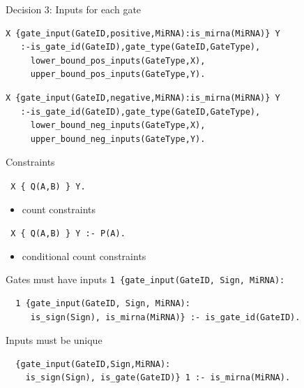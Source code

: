 \documentclass[10pt,dvipsnames]{beamer}
\begin{document}
\begin{frame}[fragile]{Decision 3: Inputs for each gate}
\small
{\color{blue}{\large positive inputs:}}
\begin{verbatim}
X {gate_input(GateID,positive,MiRNA):is_mirna(MiRNA)} Y 
   :-is_gate_id(GateID),gate_type(GateID,GateType),
     lower_bound_pos_inputs(GateType,X), 
     upper_bound_pos_inputs(GateType,Y).
\end{verbatim}

{\color{blue}{\large negative inputs:}}
\begin{verbatim}
X {gate_input(GateID,negative,MiRNA):is_mirna(MiRNA)} Y 
   :-is_gate_id(GateID),gate_type(GateID,GateType),
     lower_bound_neg_inputs(GateType,X),
     upper_bound_neg_inputs(GateType,Y).
\end{verbatim}
\end{frame}



\begin{frame}[fragile]{Constraints}
 \begin{center}
  \texttt{ X \{ Q(A,B) \} Y. }
 \end{center}
 \begin{itemize}
  \item count constraints
 \end{itemize}
 \vspace{1cm}
 \begin{center}
  \texttt{ X \{ Q(A,B) \} Y :- P(A). }
 \end{center}
 \begin{itemize}
  \item conditional count constraints
 \end{itemize}

\end{frame}


\begin{frame}[fragile]{Gates must have inputs}
 \texttt{1 \{gate\_input(GateID, Sign, MiRNA):}
 \begin{verbatim}
  1 {gate_input(GateID, Sign, MiRNA):
     is_sign(Sign), is_mirna(MiRNA)} :- is_gate_id(GateID).
 \end{verbatim}
\end{frame}


\begin{frame}[fragile]{Inputs must be unique}
 \begin{verbatim}
  {gate_input(GateID,Sign,MiRNA):
    is_sign(Sign), is_gate(GateID)} 1 :- is_mirna(MiRNA).
 \end{verbatim}
\end{frame}
\end{document}
